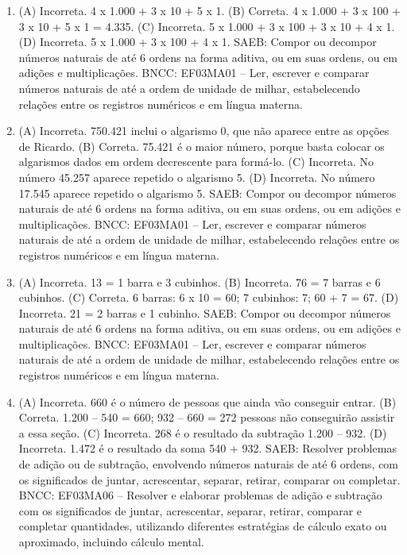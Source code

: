 \begin{enumerate}
\item
(A) Incorreta. 4 x 1.000 + 3 x 10 + 5 x 1.
(B) Correta. 4 x 1.000 + 3 x 100 + 3 x 10 + 5 x 1 = 4.335.
(C) Incorreta. 5 x 1.000 + 3 x 100 + 3 x 10 + 4 x 1.
(D) Incorreta. 5 x 1.000 + 3 x 100 + 4 x 1.
SAEB: Compor ou decompor números naturais de até 6 ordens na forma aditiva, ou em suas ordens, ou em adições e multiplicações.
BNCC: EF03MA01 -- Ler, escrever e comparar números naturais de até a ordem de unidade de milhar, estabelecendo relações entre os registros numéricos e em língua materna.

\item
(A) Incorreta. 750.421 inclui o algarismo 0, que não aparece entre as opções de Ricardo.
(B) Correta. 75.421 é o maior número, porque basta colocar os algarismos dados em ordem decrescente para formá-lo.
(C) Incorreta. No número 45.257 aparece repetido o algarismo 5. 
(D) Incorreta. No número 17.545 aparece repetido o algarismo 5. 
SAEB: Compor ou decompor números naturais de até 6 ordens na forma aditiva, ou em suas ordens, ou em adições e multiplicações.
BNCC: EF03MA01 -- Ler, escrever e comparar números naturais de até a ordem de unidade de milhar, estabelecendo relações entre os registros numéricos e em língua materna.

\item
(A) Incorreta. 13 = 1 barra e 3 cubinhos.
(B) Incorreta. 76 = 7 barras e 6 cubinhos.
(C) Correta. 6 barras: 6 x 10 = 60; 7 cubinhos: 7; 60 + 7 = 67.
(D) Incorreta. 21 = 2 barras e 1 cubinho.
SAEB: Compor ou decompor números naturais de até 6 ordens na forma aditiva, ou em suas ordens, ou em adições e multiplicações.
BNCC: EF03MA01 -- Ler, escrever e comparar números naturais de até a ordem de unidade de milhar, estabelecendo relações entre os registros numéricos e em língua materna.

\item
(A) Incorreta. 660 é o número de pessoas que ainda vão conseguir entrar.
(B) Correta. 1.200 -- 540 = 660; 932 -- 660 = 272 pessoas não conseguirão assistir a essa seção.
(C) Incorreta. 268 é o resultado da subtração 1.200 -- 932.
(D) Incorreta. 1.472 é o resultado da soma 540 + 932.
SAEB: Resolver problemas de adição ou de subtração,
envolvendo números naturais de até 6 ordens, com os significados de
juntar, acrescentar, separar, retirar, comparar ou completar.
BNCC: EF03MA06 – Resolver e elaborar problemas de adição e subtração com os significados de
juntar, acrescentar, separar, retirar, comparar e completar quantidades, utilizando diferentes
estratégias de cálculo exato ou aproximado, incluindo cálculo mental.


\end{enumerate}

